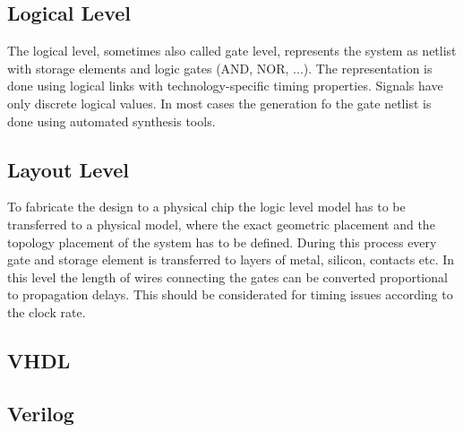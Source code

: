 \subsection{Logical Level}
The logical level, sometimes also called gate level, represents the system as netlist with storage elements and logic gates (AND, NOR, ...). The representation is done using logical links with technology-specific timing properties. Signals have only discrete logical values. In most cases the generation fo the gate netlist is done using automated synthesis tools.
\subsection{Layout Level}
To fabricate the design to a physical chip the logic level model has to be transferred to a physical model, where the exact geometric placement and the topology placement of the system has to be defined. During this process every gate and storage element is transferred to layers of metal, silicon, contacts etc.\cite{Cey96} In this level the length of wires connecting the gates can be converted proportional to propagation delays. This should be considerated for timing issues according to the clock rate.
\label{kap:HDL}
\subsection{VHDL}
\subsection{Verilog}